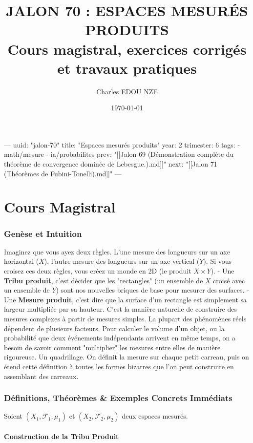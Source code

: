 \documentclass[11pt,a4paper]{article}
\title{\Huge JALON 70 : ESPACES MESURÉS PRODUITS \\ \large Cours magistral, exercices corrigés et travaux pratiques}
\author{\Large Charles EDOU NZE}
\date{\today}
\begin{document}
\maketitle
\tableofcontents
\newpage

---
uuid: "jalon-70"
title: "Espaces mesurés produits"
year: 2
trimester: 6
tags:
  - math/mesure
  - ia/probabilites
prev: "[[Jalon 69 (Démonstration complète du théorème de convergence dominée de Lebesgue.).md]]"
next: "[[Jalon 71 (Théorèmes de Fubini-Tonelli).md]]"
---

\part{Cours Magistral}

\section{Genèse et Intuition}

 Imaginez que vous ayez deux règles. L'une mesure des longueurs sur un axe horizontal ($X$), l'autre mesure des longueurs sur un axe vertical ($Y$). Si vous croisez ces deux règles, vous créez un monde en 2D (le produit $X \times Y$).
    - Une \textbf{Tribu produit}, c'est décider que les "rectangles" (un ensemble de $X$ croisé avec un ensemble de $Y$) sont nos nouvelles briques de base pour mesurer des surfaces.
    - Une \textbf{Mesure produit}, c'est dire que la surface d'un rectangle est simplement sa largeur multipliée par sa hauteur.
    C'est la manière naturelle de construire des mesures complexes à partir de mesures simples.
 La plupart des phénomènes réels dépendent de plusieurs facteurs. Pour calculer le volume d'un objet, ou la probabilité que deux événements indépendants arrivent en même temps, on a besoin de savoir comment "multiplier" les mesures entre elles de manière rigoureuse.
 Un quadrillage. On définit la mesure sur chaque petit carreau, puis on étend cette définition à toutes les formes bizarres que l'on peut construire en assemblant des carreaux.

\section{Définitions, Théorèmes \& Exemples Concrets Immédiats}

Soient $(X_1, \mathcal{F}_1, \mu_1)$ et $(X_2, \mathcal{F}_2, \mu_2)$ deux espaces mesurés.

\subsection{Construction de la Tribu Produit}
\end{document}
